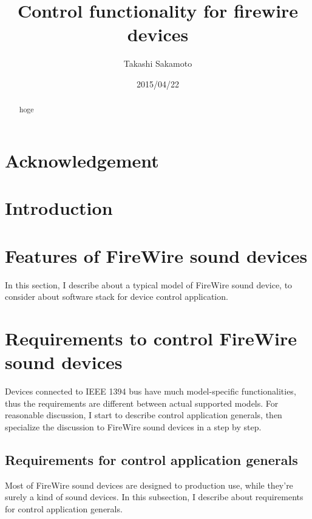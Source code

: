\documentclass[onecolumn]{article}
\begin{document}

\title{Control functionality for firewire devices}
\author{Takashi Sakamoto}
\date{2015/04/22}
\maketitle{}

\begin{abstract}

hoge

\end{abstract}

\section*{Acknowledgement}

\newpage

\tableofcontents

\newpage


\section{Introduction}


\section{Features of FireWire sound devices}

In this section, I describe about a typical model of FireWire sound device, to consider about software stack for device control application.

\section{Requirements to control FireWire sound devices}

Devices connected to IEEE 1394 bus have much model-specific functionalities, thus the requirements are different between actual supported models. For reasonable discussion, I start to describe control application generals, then specialize the discussion to FireWire sound devices in a step by step.

\subsection{Requirements for control application generals}

Most of FireWire sound devices are designed to production use, while they're surely a kind of sound devices. In this subsection, I describe about requirements for control application generals.
\end{document}
